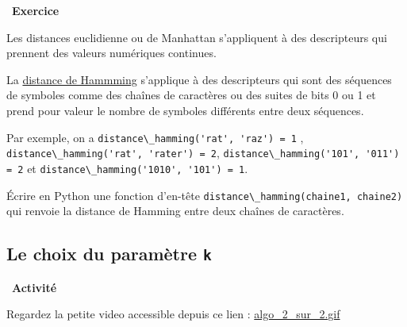 \documentclass[
  11pt,
]{article}
\newcommand{\passthrough}[1]{#1}
\newcounter{exo}
\newenvironment{exercice}[1]
{\par \medskip   \addtocounter{exo}{1} \noindent  
\begin{bclogo}[arrondi =0.1,   noborder = true, logo=\bccrayon, marge=4]{~\textbf{Exercice} \textbf{\theexo} {\itshape #1} }  \par}
{
\end{bclogo}
 \par \bigskip }
\newcounter{activite}
\newenvironment{activite}[1]
{\par \medskip   \noindent   \addtocounter{activite}{1}
\begin{bclogo}[arrondi =0.1,   noborder = true, logo=\bcvelo, marge=4]{~\textbf{Activité} \textbf{\theactivite} {\itshape #1} }  \par}
{
\end{bclogo}
 \par \bigskip }
\newcounter{alg}
\begin{document}
\begin{exercice}{}

Les distances euclidienne ou de Manhattan s'appliquent à des
descripteurs qui prennent des valeurs numériques continues.

La \href{https://fr.wikipedia.org/wiki/Distance_de_Hamming}{distance de
Hammming} s'applique à des descripteurs qui sont des séquences de
symboles comme des chaînes de caractères ou des suites de bits 0 ou 1 et
prend pour valeur le nombre de symboles différents entre deux séquences.

Par exemple, on a
\passthrough{\lstinline!distance\_hamming('rat', 'raz') = 1!} ,
\passthrough{\lstinline!distance\_hamming('rat', 'rater') = 2!},
\passthrough{\lstinline!distance\_hamming('101', '011') = 2!} et
\passthrough{\lstinline!distance\_hamming('1010', '101') = 1!}.

Écrire en Python une fonction d'en-tête
\passthrough{\lstinline!distance\_hamming(chaine1, chaine2)!} qui
renvoie la distance de Hamming entre deux chaînes de caractères.

\end{exercice}

\hypertarget{le-choix-du-paramuxe8tre-k}{%
\subsection{\texorpdfstring{Le choix du paramètre
\texttt{k}}{Le choix du paramètre k}}\label{le-choix-du-paramuxe8tre-k}}

\begin{activite}{}

Regardez la petite video accessible depuis ce lien :
\url{algo_2_sur_2.gif}

\end{activite}
\end{document}
